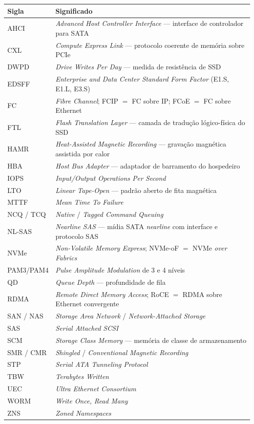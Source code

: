 \documentclass[11pt,a4paper]{article}
\begin{document}
\begin{center}\small
\begin{tabular}{@{}p{2.6cm}p{13.0cm}@{}}
\toprule
\textbf{Sigla} & \textbf{Significado} \\
\midrule
AHCI & \emph{Advanced Host Controller Interface} --- interface de controlador para SATA \\
CXL & \emph{Compute Express Link} --- protocolo coerente de memória sobre PCIe \\
DWPD & \emph{Drive Writes Per Day} --- medida de resistência de SSD \\
EDSFF & \emph{Enterprise and Data Center Standard Form Factor} (E1.S, E1.L, E3.S) \\
FC & \emph{Fibre Channel}; FCIP $=$ FC sobre IP; FCoE $=$ FC sobre Ethernet \\
FTL & \emph{Flash Translation Layer} --- camada de tradução lógico-física do SSD \\
HAMR & \emph{Heat-Assisted Magnetic Recording} --- gravação magnética assistida por calor \\
HBA & \emph{Host Bus Adapter} --- adaptador de barramento do hospedeiro \\
IOPS & \emph{Input/Output Operations Per Second} \\
LTO & \emph{Linear Tape-Open} --- padrão aberto de fita magnética \\
MTTF & \emph{Mean Time To Failure} \\
NCQ / TCQ & \emph{Native} / \emph{Tagged Command Queuing} \\
NL-SAS & \emph{Nearline SAS} --- mídia SATA \emph{nearline} com interface e protocolo SAS \\
NVMe & \emph{Non-Volatile Memory Express}; NVMe-oF $=$ NVMe \emph{over Fabrics} \\
PAM3/PAM4 & \emph{Pulse Amplitude Modulation} de 3 e 4 níveis \\
QD & \emph{Queue Depth} --- profundidade de fila \\
RDMA & \emph{Remote Direct Memory Access}; RoCE $=$ RDMA sobre Ethernet convergente \\
SAN / NAS & \emph{Storage Area Network} / \emph{Network-Attached Storage} \\
SAS & \emph{Serial Attached SCSI} \\
SCM & \emph{Storage Class Memory} --- memória de classe de armazenamento \\
SMR / CMR & \emph{Shingled} / \emph{Conventional Magnetic Recording} \\
STP & \emph{Serial ATA Tunneling Protocol} \\
TBW & \emph{Terabytes Written} \\
UEC & \emph{Ultra Ethernet Consortium} \\
WORM & \emph{Write Once, Read Many} \\
ZNS & \emph{Zoned Namespaces} \\
\bottomrule
\end{tabular}
\end{center}
\end{document}
